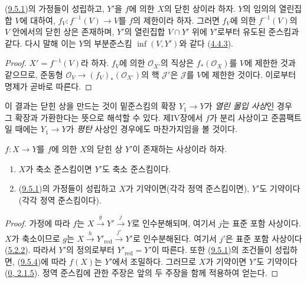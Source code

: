 \begin{proposition}[9.5.8]
\label{I.9.5.8-ko}
(\hyperref[I.9.5.1-ko]{9.5.1})의 가정들이 성립하고, $Y'$을 $f$에
의한 $X$의 닫힌 상이라 하자. $Y$의 임의의 열린집합 $V$에 대하여,
$f_V:f^{-1}(V)\to V$를 $f$의 제한이라 하자. 그러면 $f_V$에 의한
$f^{-1}(V)$의 $V$ 안에서의 닫힌 상은 존재하며, $Y'$의 열린집합
$V\cap Y'$ 위에 $Y'$로부터 유도된 준스킴과 같다. 다시 말해 이는
$Y$의 부분준스킴 $\inf(V,Y')$와 같다
(\hyperref[I.4.4.3-ko]{4.4.3}).
\end{proposition}

\begin{proof}
$X'=f^{-1}(V)$라 하자. $f_V$에 의한 $\mathscr{O}_{X'}$의 직상은
$f_*(\mathscr{O}_X)$를 $V$에 제한한 것과 같으므로, 준동형
$\mathscr{O}_V\to(f_V)_*(\mathscr{O}_{X'})$의 핵
$\mathscr{J}'$은 $\mathscr{J}$를 $V$에 제한한 것이다. 이로부터
명제가 곧바로 따른다.
\end{proof}

이 결과는 닫힌 상을 만드는 것이 밑준스킴의 확장 $Y_1\to Y$가
\emph{열린 몰입 사상}인 경우 그 확장과 가환한다는 뜻으로 해석할
수 있다. 제IV장에서 $f$가 분리 사상이고 준콤팩트일 때에는
$Y_1\to Y$가 \emph{평탄} 사상인 경우에도 마찬가지임을 볼 것이다.

\begin{proposition}[9.5.9]
\label{I.9.5.9-ko}
$f:X\to Y$를 $f$에 의한 $X$의 닫힌 상 $Y'$이 존재하는 사상이라
하자.
\begin{enumerate}
  \item[(i)] $X$가 축소 준스킴이면 $Y'$도 축소 준스킴이다.
  \item[(ii)] (\hyperref[I.9.5.1-ko]{9.5.1})의 가정들이 성립하고
    $X$가 기약이면(각각 정역 준스킴이면), $Y'$도 기약이다
    (각각 정역 준스킴이다).
\end{enumerate}
\end{proposition}

\begin{proof}
가정에 따라 $f$는 $X\xrightarrow{g}Y'\xrightarrow{j}Y$로
인수분해되며, 여기서 $j$는 표준 포함 사상이다. $X$가 축소이므로
$g$는 $X\xrightarrow{h}Y'_{\mathrm{red}}\xrightarrow{j'}Y'$로
인수분해된다. 여기서 $j'$은 표준 포함 사상이다
(\hyperref[I.5.2.2-ko]{5.2.2}). 따라서 $Y'$의 정의로부터
$Y'_{\mathrm{red}}=Y'$이 따른다. 또한
(\hyperref[I.9.5.1-ko]{9.5.1})의 조건들이 성립하면,
(\hyperref[I.9.5.4-ko]{9.5.4})에 따라 $f(X)$는 $Y'$에서 조밀하다.
그러므로 $X$가 기약이면 $Y'$도 기약이다
(\hyperref[0.2.1.5-ko]{0, 2.1.5}). 정역 준스킴에 관한 주장은
앞의 두 주장을 함께 적용하여 얻는다.
\end{proof}


